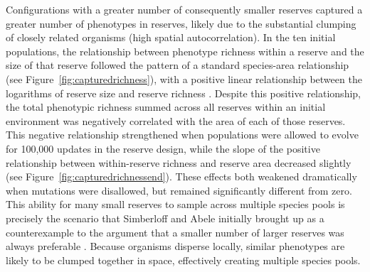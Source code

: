 \documentclass[letterpaper]{article}
\begin{document}
    Configurations with a greater number of consequently smaller reserves captured a greater number of phenotypes in reserves, likely due to the substantial clumping of closely related organisms (high spatial autocorrelation). In the ten initial populations, the relationship between phenotype richness within a reserve and the size of that reserve followed the pattern of a standard species-area relationship (see Figure~\ref{fig:capturedrichness}), with a positive linear relationship between the logarithms of reserve size and reserve richness \citep{connor_statistics_1979}. Despite this positive relationship, the total phenotypic richness summed across all reserves within an initial environment was negatively correlated with the area of each of those reserves. This negative relationship strengthened when populations were allowed to evolve for 100,000 updates in the reserve design, while the slope of the positive relationship between within-reserve richness and reserve area decreased slightly (see Figure~\ref{fig:capturedrichnessend}). These effects both weakened dramatically when mutations were disallowed, but remained significantly different from zero. This ability for many small reserves to sample across multiple species pools is precisely the scenario that Simberloff and Abele initially brought up as a counterexample to the argument that a smaller number of larger reserves was always preferable \citep{simberloff_island_1976}. Because organisms disperse locally, similar phenotypes are likely to be clumped together in space, effectively creating multiple species pools. 
    
\end{document}
